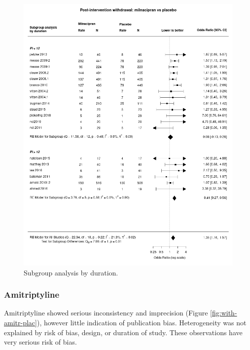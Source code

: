\documentclass{report}\usepackage[]{graphicx}\usepackage[]{color}
\begin{document}
\begin{figure}
\includegraphics[width=\textwidth]{img/withdrawal-duration-milnacipran-placebo-forest.png}
\caption[Withdrawal duration: milnacipran]{
Subgroup analysis by duration.
}
\label{fig:withdrawal-duration-milna-plac}
\end{figure}

\subsubsection{Amitriptyline}

Amitriptyline showed serious inconsistency and imprecision (Figure \ref{fig:with-amitr-plac}), however little indication of publication bias. Heterogeneity was not explained by risk of bias, design, or duration of study. These observations have very serious risk of bias.
\end{document}
